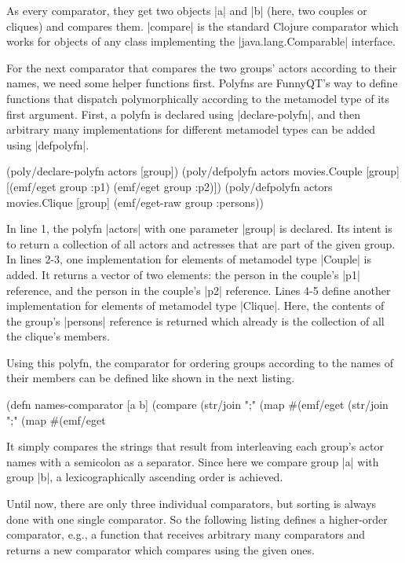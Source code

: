\documentclass[submission]{eptcs}
\newcommand{\code}{\clojureinline}
\begin{document}
As every comparator, they get two objects \code|a| and \code|b| (here, two
couples or cliques) and compares them.  \code|compare| is the standard Clojure
comparator which works for objects of any class implementing the
\code|java.lang.Comparable| interface.

For the next comparator that compares the two groups' actors according to their
names, we need some helper functions first.  Polyfns are FunnyQT's way to
define functions that dispatch polymorphically according to the metamodel type
of its first argument.  First, a polyfn is declared using
\code|declare-polyfn|, and then arbitrary many implementations for different
metamodel types can be added using \code|defpolyfn|.

\begin{clojurecode}
(poly/declare-polyfn actors [group])
(poly/defpolyfn actors movies.Couple [group]
  [(emf/eget group :p1) (emf/eget group :p2)])
(poly/defpolyfn actors movies.Clique [group]
  (emf/eget-raw group :persons))
\end{clojurecode}

In line 1, the polyfn \code|actors| with one parameter \code|group| is
declared.  Its intent is to return a collection of all actors and actresses
that are part of the given group.  In lines 2-3, one implementation for
elements of metamodel type \code|Couple| is added.  It returns a vector of two
elements: the person in the couple's \code|p1| reference, and the person in the
couple's \code|p2| reference.  Lines 4-5 define another implementation for
elements of metamodel type \code|Clique|.  Here, the contents of the group's
\code|persons| reference is returned which already is the collection of all the
clique's members.

Using this polyfn, the comparator for ordering groups according to the names of
their members can be defined like shown in the next listing.

\begin{clojurecode}
(defn names-comparator [a b]
  (compare (str/join ";" (map #(emf/eget %
           (str/join ";" (map #(emf/eget %
\end{clojurecode}

It simply compares the strings that result from interleaving each group's actor
names with a semicolon as a separator.  Since here we compare group \code|a|
with group \code|b|, a lexicographically ascending order is achieved.

Until now, there are only three individual comparators, but sorting is always
done with one single comparator.  So the following listing defines a
higher-order comparator, e.g., a function that receives arbitrary many
comparators and returns a new comparator which compares using the given ones.
\end{document}
